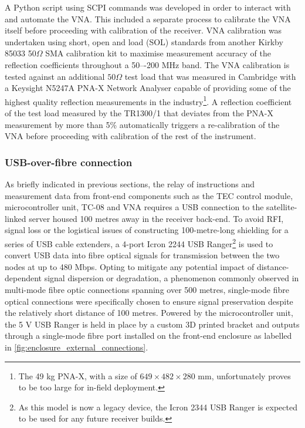 A Python script using SCPI commands was developed in order to interact with and automate the VNA. This included a separate process to calibrate the VNA itself before proceeding with calibration of the receiver. VNA calibration was undertaken using short, open and load (SOL) standards from another Kirkby 85033 50$\Omega$ SMA calibration kit to maximise measurement accuracy of the reflection coefficients throughout a 50–-200 MHz band. The VNA calibration is tested against an additional $50\Omega$ test load that was measured in Cambridge with a Keysight N5247A PNA-X Network Analyser capable of providing some of the highest quality reflection measurements in the industry\footnote{The 49 kg PNA-X, with a size of $649 \times 482 \times 280$ mm, unfortunately proves to be too large for in-field deployment.}. A reflection coefficient of the test load measured by the TR1300/1 that deviates from the PNA-X measurement by more than 5\% automatically triggers a re-calibration of the VNA before proceeding with calibration of the rest of the instrument.


\subsubsection{USB-over-fibre connection}
As briefly indicated in previous sections, the relay of instructions and measurement data from front-end components such as the TEC control module, microcontroller unit, TC-08 and VNA requires a USB connection to the satellite-linked server housed 100 metres away in the receiver back-end. To avoid RFI, signal loss or the logistical issues of constructing 100-metre-long shielding for a series of USB cable extenders, a 4-port Icron 2244 USB Ranger\footnote{As this model is now a legacy device, the Icron 2344 USB Ranger is expected to be used for any future receiver builds.} is used to convert USB data into fibre optical signals for transmission between the two nodes at up to 480 Mbps. Opting to mitigate any potential impact of distance-dependent signal dispersion or degradation, a phenomenon commonly observed in multi-mode fibre optic connections spanning over 500 metres, single-mode fibre optical connections were specifically chosen to ensure signal preservation despite the relatively short distance of 100 metres. Powered by the microcontroller unit, the 5 V USB Ranger is held in place by a custom 3D printed bracket and outputs through a single-mode fibre port installed on the front-end enclosure as labelled in \cref{fig:enclosure_external_connections}.


